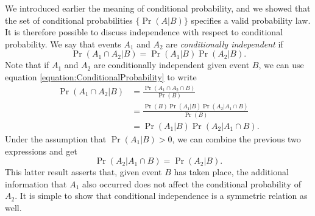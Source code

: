 We introduced earlier the meaning of conditional probability, and we showed that the set of conditional probabilities $\{ \Pr (A|B) \}$ specifies a valid probability law.
It is therefore possible to discuss independence with respect to conditional probability.
We say that events $A_1$ and $A_2$ are \emph{conditionally independent} if 
\begin{equation*}
\Pr (A_1 \cap A_2 | B) = \Pr (A_1 | B) \Pr (A_2 | B) .
\end{equation*}
Note that if $A_1$ and $A_2$ are conditionally independent given event $B$, we can use equation \eqref{equation:ConditionalProbability} to write
\begin{equation*}
\begin{split}
\Pr (A_1 \cap A_2 | B) &= \frac{ \Pr (A_1 \cap A_2 \cap  B) }{\Pr (B)} \\
&= \frac{ \Pr (B) \Pr (A_1 | B) \Pr (A_2 | A_1 \cap  B) }{\Pr (B)} \\
&= \Pr (A_1 | B) \Pr (A_2 | A_1 \cap  B) .
\end{split}
\end{equation*}
Under the assumption that $\Pr (A_1 | B) > 0$, we can combine the previous two expressions and get
\begin{equation*}
\Pr (A_2 | A_1 \cap  B) = \Pr (A_2 | B) .
\end{equation*}
This latter result asserts that, given event $B$ has taken place, the additional information that $A_1$ also occurred does not affect the conditional probability of $A_2$.
It is simple to show that conditional independence is a symmetric relation as well.

